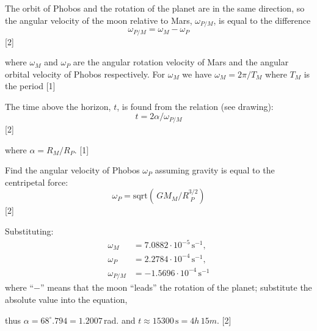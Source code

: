 The orbit of Phobos and the rotation of the planet are in the same direction,
so the angular velocity of the moon relative to Mars, $\omega_{P/M}$, is equal
to the difference
\[
  \omega_{P/M} = \omega_M - \omega_P
\]
\hfill[2]

where $\omega_M$ and $\omega_P$ are the angular rotation velocity of Mars and
the angular orbital velocity of Phobos respectively.
For $\omega_M$ we have $\omega_M = 2\pi/T_M$ where $T_M$ is the period \hfill[1]

The time above the horizon, $t$, is found from the relation (see drawing):
\[
  t = 2\alpha/\omega_{P/M}
\]
\hfill[2]

where $\alpha = R_M/R_P$.
\hfill[1]


Find the angular velocity of Phobos $\omega_P$ assuming gravity is equal to
the centripetal force:
\[
  \omega_P = \mathrm{sqrt}(\,GM_M/R^{3/2}_{\;P})
\]
\hfill[2]

Substituting:
\begin{align*}
  \omega_M &= 7.0882\cdot 10^{-5}\,\mathrm{s}^{-1}, \\
  \omega_P &= 2.2784\cdot 10^{-4}\,\mathrm{s}^{-1}, \\
  \omega_{P/M} &= -1.5696\cdot 10^{-4}\,\mathrm{s}^{-1}
\end{align*}
where ``$-$'' means that the moon ``leads'' the rotation of the planet;
substitute the absolute value into the equation,

thus
$\alpha = 68^\circ\!.794 = 1.2007$\,rad.
and $t \approx 15300\,\mathrm{s} = 4h\,15m$. \hfill[2]
